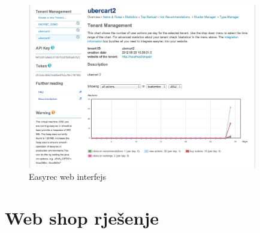 \documentclass[times, utf8, seminar]{fit}
\begin{document}
\begin{figure}[H]
\centering
\includegraphics[width=10cm]{img/easyrec_1_tenant.png}
\caption{Easyrec web interfejs}
\end{figure}

\section{Web shop rješenje}
\end{document}
